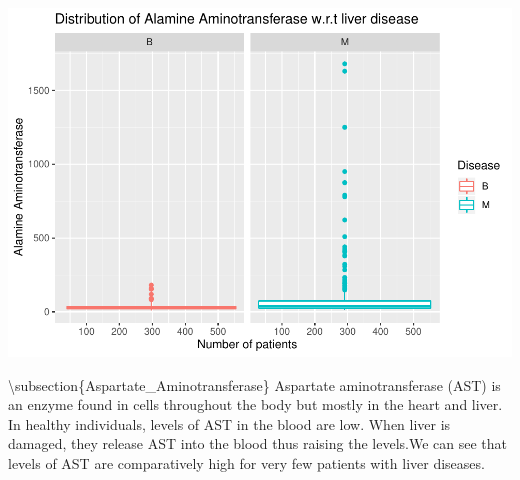 \documentclass[]{article}
\newenvironment{Shaded}{\begin{snugshade}}{\end{snugshade}}
\newcommand{\CommentTok}[1]{\textcolor[rgb]{0.56,0.35,0.01}{\textit{#1}}}
\newcommand{\DataTypeTok}[1]{\textcolor[rgb]{0.13,0.29,0.53}{#1}}
\newcommand{\KeywordTok}[1]{\textcolor[rgb]{0.13,0.29,0.53}{\textbf{#1}}}
\newcommand{\NormalTok}[1]{#1}
\newcommand{\OperatorTok}[1]{\textcolor[rgb]{0.81,0.36,0.00}{\textbf{#1}}}
\newcommand{\StringTok}[1]{\textcolor[rgb]{0.31,0.60,0.02}{#1}}
\begin{document}
\begin{Shaded}
\end{Shaded}

\includegraphics{LiverDisease_files/figure-latex/unnamed-chunk-13-1.pdf}

\textbackslash subsection\{Aspartate\_Aminotransferase\} Aspartate
aminotransferase (AST) is an enzyme found in cells throughout the body
but mostly in the heart and liver. In healthy individuals, levels of AST
in the blood are low. When liver is damaged, they release AST into the
blood thus raising the levels.We can see that levels of AST are
comparatively high for very few patients with liver diseases.
\end{document}
